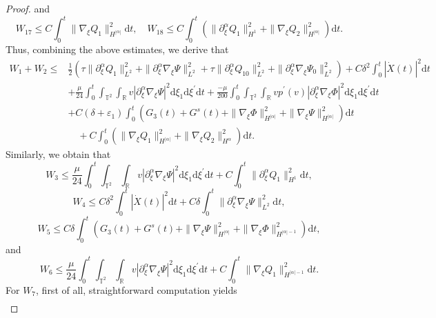 \documentclass[10pt,reqno]{amsart}
\numberwithin{equation}{section}
\newcommand{\dif}{\mathrm{d}}
\begin{document}
\begin{proof}
and
\[
 W_{17} \le C\int_0^t\|\nabla_\xi Q_1\|_{H^{|\alpha|}}^2\dif t,
 \quad
  W_{18} \le C\int_0^t\left(\|\partial_\xi^\alpha Q_1\|_{H^1}^2+\|\nabla_\xi Q_2\|_{H^{|\alpha|}}^2\right)\dif t.
\]
Thus, combining the above estimates, we derive that
\begin{equation}\label{w1}
\begin{aligned}
W_1+W_2\le& \frac{1}{2}\left(\tau\|\partial_\xi^\alpha Q_{1}\|_{L^2}^2+\|\partial_\xi^\alpha\nabla_\xi\Psi\|_{L^2}^2
+\tau\|\partial_\xi^\alpha Q_{10}\|_{L^2}^2+\|\partial_\xi^\alpha\nabla_\xi\Psi_0\|_{L^2}^2\right)
+C\delta^2\int_0^t|\dot X(t)|^2\dif t\\
&
+\frac{\mu}{24}\int_0^t\int_{\mathbb{T}^2}\int_{\mathbb{R}}v|\partial_\xi^\alpha\nabla_\xi\Psi|^2\dif \xi_1\dif \xi^{\prime}\dif t
+\frac{-\mu}{200}\int_0^t\int_{\mathbb{T}^2}\int_{\mathbb{R}}vp^\prime(v)|\partial_\xi^\alpha\nabla_\xi\Phi|^2\dif \xi_1\dif \xi^{\prime}\dif t\\
&+C(\delta+\varepsilon_1)\int_0^t\left(G_3(t)+G^s(t)+\|\nabla_\xi \Phi\|_{H^{|\alpha|}}^2+\|\nabla_\xi \Psi\|_{H^{|\alpha|}}^2\right)\dif t\\
&\quad+C\int_0^t\left(\|\nabla_\xi Q_1\|_{H^{|\alpha|}}^2+\|\nabla_\xi Q_2\|_{H^{\alpha}}^2\right)\dif t.
\end{aligned}
\end{equation}
Similarly, we obtain that
\begin{equation}\label{w3}
W_3\le \frac{\mu}{24}\int_0^t\int_{\mathbb{T}^2}\int_{\mathbb{R}}v|\partial_\xi^\alpha\nabla_\xi\Psi|^2\dif \xi_1\dif \xi^{\prime}\dif t
+C\int_0^t\|\partial_\xi^\alpha Q_1\|_{H^{1}}^2\dif t,
\end{equation}
\begin{equation}\label{w4}
W_4\le C\delta^2\int_0^t|\dot X(t)|^2\dif t+C\delta\int_0^t\|\partial_\xi^\alpha\nabla_\xi \Psi\|_{L^2}^2\dif t,
\end{equation}
\begin{equation}\label{w5}
W_5\le  C\delta\int_0^t\left(G_3(t)+G^s(t)
+\|\nabla_\xi\Psi\|_{H^{|\alpha|}}^2+\|\nabla_\xi\Phi\|_{H^{|\alpha|-1}}^2\right)\dif t,
\end{equation}
and
\begin{equation}\label{w6}
W_6\le \frac{\mu}{24}\int_0^t\int_{\mathbb{T}^2}\int_{\mathbb{R}}v|\partial_\xi^\alpha\nabla_\xi\Psi|^2\dif \xi_1\dif \xi^{\prime}\dif t
+C\int_0^t\|\nabla_\xi Q_1\|_{H^{|\alpha|-1}}^2\dif t.
\end{equation}
For $W_7$, first of all, straightforward computation yields
\begin{align*}

\end{align*}
\end{proof}
\end{document}
